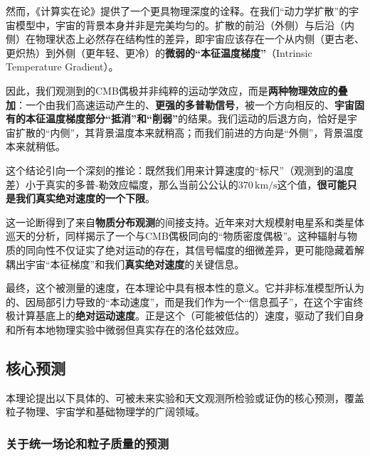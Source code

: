 \documentclass[11pt, a4paper]{article}
\begin{document}
然而，《计算实在论》提供了一个更具物理深度的诠释。在我们“动力学扩散”的宇宙模型中，宇宙的背景本身并非是完美均匀的。扩散的前沿（外侧）与后沿（内侧）在物理状态上必然存在结构性的差异，即宇宙应该存在一个从内侧（更古老、更炽热）到外侧（更年轻、更冷）的\textbf{微弱的“本征温度梯度”}（Intrinsic Temperature Gradient）。

因此，我们观测到的CMB偶极并非纯粹的运动学效应，而是\textbf{两种物理效应的叠加}：一个由我们高速运动产生的、\textbf{更强的多普勒信号}，被一个方向相反的、\textbf{宇宙固有的本征温度梯度部分“抵消”和“削弱”}的结果。我们运动的后退方向，恰好是宇宙扩散的“内侧”，其背景温度本来就稍高；而我们前进的方向是“外侧”，背景温度本来就稍低。

这个结论引向一个深刻的推论：既然我们用来计算速度的“标尺”（观测到的温度差）小于真实的多普-勒效应幅度，那么当前公公认的$370\,\mathrm{km/s}$这个值，\textbf{很可能只是我们真实绝对速度的一个下限}。

这一论断得到了来自\textbf{物质分布观测}的间接支持。近年来对大规模射电星系和类星体巡天的分析，同样揭示了一个与CMB偶极同向的“物质密度偶极”。这种辐射与物质的同向性不仅证实了绝对运动的存在，其信号幅度的细微差异，更可能隐藏着解耦出宇宙“本征梯度”和我们\textbf{真实绝对速度}的关键信息。

最终，这个被测量的速度，在本理论中具有根本性的意义。它并非标准模型所认为的、因局部引力导致的“本动速度”，而是我们作为一个“信息孤子”，在这个宇宙终极计算基底上的\textbf{绝对运动速度}。正是这个（可能被低估的）速度，驱动了我们自身和所有本地物理实验中微弱但真实存在的洛伦兹效应。


\subsection{核心预测}

本理论提出以下具体的、可被未来实验和天文观测所检验或证伪的核心预测，覆盖粒子物理、宇宙学和基础物理学的广阔领域。

\subsubsection{关于统一场论和粒子质量的预测}
\end{document}

